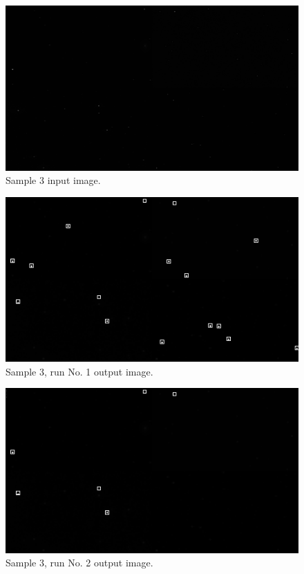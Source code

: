 \documentclass[12pt]{report}
\begin{document}
\begin{figure}[h]
    \centering
    \includegraphics[scale=1.2]{results/s2_in.png}
    \caption{Sample 3 input image.}
    \label{res:s2_in}
\end{figure}
\begin{figure}[h]
    \centering
    \includegraphics[scale=1.2]{results/s2_1.png}
    \caption{Sample 3, run No. 1 output image.}
    \label{res:s2_1}
\end{figure}
\begin{figure}[h]
    \centering
    \includegraphics[scale=1.2]{results/s2_2.png}
    \caption{Sample 3, run No. 2 output image.}
    \label{res:s2_2}
\end{figure}
\end{document}
